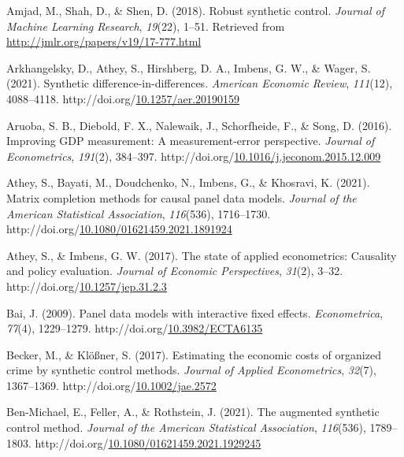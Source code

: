 \documentclass[12pt,nobind, a4paper]{reedthesis}
\newlength{\cslhangindent}
\newenvironment{CSLReferences}[2] %
{%
	\setlength{\parindent}{0pt}
	\ifodd #1 \everypar{\setlength{\hangindent}{\cslhangindent}}\ignorespaces\fi
	\ifnum #2 > 0
	\setlength{\parskip}{#2\baselineskip}
	\fi
}%
{}
\begin{document}
\begin{CSLReferences}{1}{0}
 \leavevmode{}%
 Amjad, M., Shah, D., \& Shen, D. (2018). Robust synthetic control. \emph{Journal of Machine Learning Research}, \emph{19}(22), 1--51. Retrieved from \url{http://jmlr.org/papers/v19/17-777.html}

 \leavevmode{}%
 Arkhangelsky, D., Athey, S., Hirshberg, D. A., Imbens, G. W., \& Wager, S. (2021). Synthetic difference-in-differences. \emph{American Economic Review}, \emph{111}(12), 4088--4118. http://doi.org/\href{https://doi.org/10.1257/aer.20190159}{10.1257/aer.20190159}

 \leavevmode{}%
 Aruoba, S. B., Diebold, F. X., Nalewaik, J., Schorfheide, F., \& Song, D. (2016). Improving {GDP} measurement: A measurement-error perspective. \emph{Journal of Econometrics}, \emph{191}(2), 384--397. http://doi.org/\href{https://doi.org/10.1016/j.jeconom.2015.12.009}{10.1016/j.jeconom.2015.12.009}

 \leavevmode{}%
 Athey, S., Bayati, M., Doudchenko, N., Imbens, G., \& Khosravi, K. (2021). Matrix completion methods for causal panel data models. \emph{Journal of the American Statistical Association}, \emph{116}(536), 1716--1730. http://doi.org/\href{https://doi.org/10.1080/01621459.2021.1891924}{10.1080/01621459.2021.1891924}

 \leavevmode{}%
 Athey, S., \& Imbens, G. W. (2017). The state of applied econometrics: Causality and policy evaluation. \emph{Journal of Economic Perspectives}, \emph{31}(2), 3--32. http://doi.org/\href{https://doi.org/10.1257/jep.31.2.3}{10.1257/jep.31.2.3}

 \leavevmode{}%
 Bai, J. (2009). Panel data models with interactive fixed effects. \emph{Econometrica}, \emph{77}(4), 1229--1279. http://doi.org/\href{https://doi.org/10.3982/ECTA6135}{10.3982/ECTA6135}

 \leavevmode{}%
 Becker, M., \& Klößner, S. (2017). Estimating the economic costs of organized crime by synthetic control methods. \emph{Journal of Applied Econometrics}, \emph{32}(7), 1367--1369. http://doi.org/\href{https://doi.org/10.1002/jae.2572}{10.1002/jae.2572}

 \leavevmode{}%
 Ben-Michael, E., Feller, A., \& Rothstein, J. (2021). The augmented synthetic control method. \emph{Journal of the American Statistical Association}, \emph{116}(536), 1789--1803. http://doi.org/\href{https://doi.org/10.1080/01621459.2021.1929245}{10.1080/01621459.2021.1929245}


\end{CSLReferences}
\end{document}
